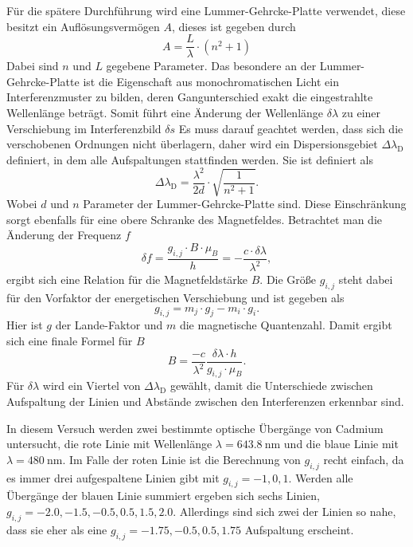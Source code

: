 Für die spätere Durchführung wird eine Lummer-Gehrcke-Platte verwendet, diese besitzt ein Auflösungsvermögen $A$, dieses ist gegeben durch 
\begin{equation}
    A = \frac{L}{\lambda} \cdot \left( n^2 + 1 \right)
   \label{eq:aufloesung}
\end{equation}
Dabei sind $n$ und $L$ gegebene Parameter.
Das besondere an der Lummer-Gehrcke-Platte ist die Eigenschaft aus monochromatischen Licht ein Interferenzmuster zu bilden, deren Gangunterschied exakt die eingestrahlte Wellenlänge beträgt.
Somit führt eine Änderung der Wellenlänge $\delta \lambda$ zu einer Verschiebung im Interferenzbild  $\delta s$
Es muss darauf geachtet werden, dass sich die verschobenen Ordnungen nicht überlagern, daher wird ein Dispersionsgebiet $\Delta \lambda _\text{D}$ definiert, in dem alle Aufspaltungen stattfinden werden. 
Sie ist definiert als 
\begin{equation}
    \Delta \lambda _\text{D} = \frac{\lambda ^2}{2 d} \cdot \sqrt{ \frac{1}{n^2 + 1}    }.
   \label{eq:dispers}
\end{equation}
Wobei $d$ und $n$ Parameter der Lummer-Gehrcke-Platte sind. 
Diese Einschränkung sorgt ebenfalls für eine obere Schranke des Magnetfeldes.
Betrachtet man die Änderung der Frequenz $f$
\begin{equation}
    \delta f = \frac{g_{i,j} \cdot B \cdot \mu_B }{h} = - \frac{c \cdot \delta \lambda}{\lambda ^2},
   \label{eq:freq}
\end{equation}
ergibt sich eine Relation für die Magnetfeldstärke $B$.
Die Größe $g_{i,j}$ steht dabei für den Vorfaktor der energetischen Verschiebung und ist gegeben als
\begin{equation}
    g_{i,j} = m_j \cdot g_j - m_i \cdot g_i.
   \label{eq:gij}
\end{equation}
Hier ist $g$ der Lande-Faktor und $m$ die magnetische Quantenzahl.
Damit ergibt sich eine finale Formel für $B$
\begin{equation}
    B =  \frac{- c}{\lambda ^2} \frac{\delta \lambda \cdot h}{g_{i,j}  \cdot \mu_B}.
   \label{eq:bfeld}
\end{equation}
Für $\delta \lambda $ wird ein Viertel von $\Delta \lambda _\text{D}$ gewählt, damit die Unterschiede zwischen Aufspaltung der Linien und Abstände zwischen den Interferenzen erkennbar sind.

In diesem Versuch werden zwei bestimmte optische Übergänge von Cadmium untersucht, die rote Linie mit Wellenlänge $\lambda = \SI{643.8}{\nano\meter}$ 
und die blaue Linie mit $\lambda = \SI{480}{\nano\meter}$.
Im Falle der roten Linie ist die Berechnung von $g_{i,j}$ recht einfach, da es immer drei aufgespaltene Linien gibt mit $g_{i,j} = -1, 0, 1$.
Werden alle Übergänge der blauen Linie summiert ergeben sich sechs Linien, $g_{i,j} = -2.0, -1.5, -0.5, 0.5, 1.5, 2.0$.
Allerdings sind sich zwei der Linien so nahe, dass sie eher als eine $g_{i,j} = -1.75, -0.5, 0.5, 1.75$ Aufspaltung erscheint.